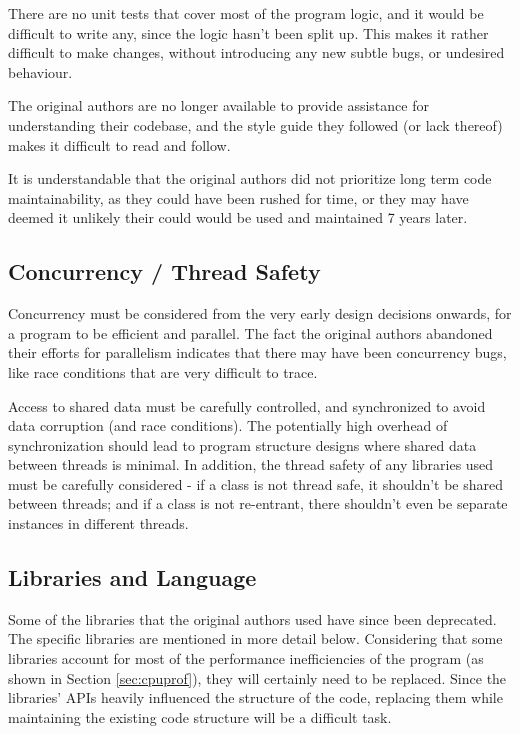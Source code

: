 There are no unit tests that cover most of the program logic, and it would be difficult to write any, since the logic hasn't been split up. This makes it rather difficult to make changes, without introducing any new subtle bugs, or undesired behaviour.

The original authors are no longer available to provide assistance for understanding their codebase, and the style guide they followed (or lack thereof) makes it difficult to read and follow.

It is understandable that the original authors did not prioritize long term code maintainability, as they could have been rushed for time, or they may have deemed it unlikely their could would be used and maintained 7 years later.

\subsection{Concurrency / Thread Safety}

Concurrency must be considered from the very early design decisions onwards, for a program to be efficient and parallel. The fact the original authors abandoned their efforts for parallelism indicates that there may have been concurrency bugs, like race conditions \autocite{raceconditions} that are very difficult to trace.

Access to shared data must be carefully controlled, and synchronized to avoid data corruption (and race conditions). The potentially high overhead of synchronization should lead to program structure designs where shared data between threads is minimal. In addition, the thread safety of any libraries used must be carefully considered - if a class is not thread safe, it shouldn't be shared  between threads; and if a class is not re-entrant, there shouldn't even be separate instances in different threads.

\subsection{Libraries and Language}
Some of the libraries that the original authors used have since been deprecated. The specific libraries are mentioned in more detail below. Considering that some libraries account for most of the performance inefficiencies of the program (as shown in Section \ref{sec:cpuprof}), they will certainly need to be replaced. Since the libraries' APIs heavily influenced the structure of the code, replacing them while maintaining the existing code structure will be a difficult task.

